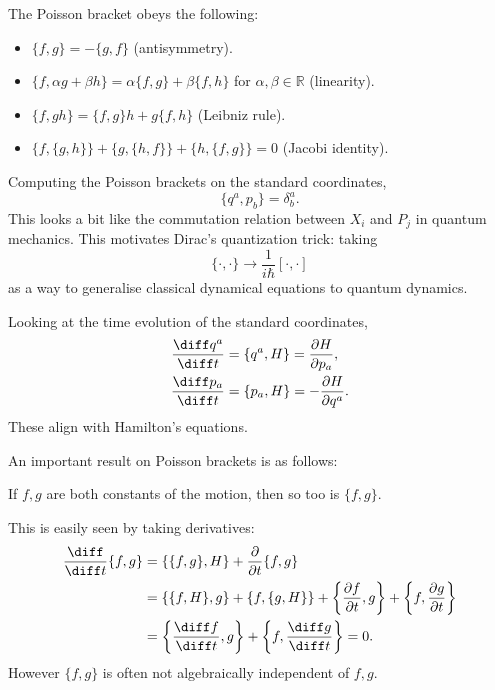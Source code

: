 \documentclass[12pt]{article}
\begin{document}
The Poisson bracket obeys the following:
\begin{itemize}
	\item $\{f, g\} = -\{g, f\}$ (antisymmetry).
	\item $\{f, \alpha g + \beta h\} = \alpha \{f, g\} + \beta \{f, h\}$ for $\alpha, \beta \in \mathbb{R}$ (linearity).
	\item $\{f, gh\} = \{f, g\} h + g \{f, h\}$ (Leibniz rule).
	\item $\{f, \{g, h\}\} + \{g, \{h, f\}\} + \{h, \{f, g\}\} = 0$ (Jacobi identity).
\end{itemize}

\begin{exbox}
	Computing the Poisson brackets on the standard coordinates,
	\[
		\{q^a, p_b\} = \delta^a_b.
	\]
	This looks a bit like the commutation relation between $X_i$ and $P_j$ in quantum mechanics. This motivates Dirac's quantization trick: taking
	\[
		\{ \cdot, \cdot \} \to \frac{1}{i\hbar} [\cdot, \cdot]
	\]
	as a way to generalise classical dynamical equations to quantum dynamics.

	Looking at the time evolution of the standard coordinates,
	\begin{align*}
		\frac{\diff q^a}{\diff t} &= \{q^a, H\} = \frac{\partial H}{\partial p_a}, \\
		\frac{\diff p_a}{\diff t} &= \{p_a, H\} = - \frac{\partial H}{\partial q^a}.
	\end{align*}
	These align with Hamilton's equations.
\end{exbox}

An important result on Poisson brackets is as follows:
\begin{theorem}
	If $f, g$ are both constants of the motion, then so too is $\{f, g\}$.
\end{theorem}
This is easily seen by taking derivatives:
\begin{align*}
	\frac{\diff}{\diff t} \{f, g\} &= \{\{f, g\}, H\} + \frac{\partial}{\partial t} \{f, g\} \\
				       &= \{\{f, H\}, g\} + \{f, \{g, H\}\} + \biggl\{ \frac{\partial f}{\partial t}, g \biggr\} + \biggl\{f, \frac{\partial g}{\partial t} \biggr\} \\
				       &= \biggl\{ \frac{\diff f}{\diff t}, g \biggr\} + \biggl\{f, \frac{\diff g}{\diff t} \biggr\} = 0.
\end{align*}
However $\{f, g\}$ is often not algebraically independent of $f, g$.

\end{document}
